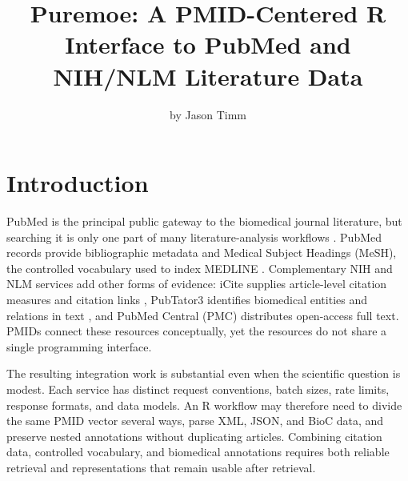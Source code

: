 \title{Puremoe: A PMID-Centered R Interface to PubMed and NIH/NLM Literature Data}


\author{by Jason Timm}

\maketitle


\section{Introduction}\label{introduction}

PubMed is the principal public gateway to the biomedical journal literature,
but searching it is only one part of many literature-analysis workflows
\citep{lu2011pubmed}. PubMed records provide bibliographic metadata and Medical
Subject Headings (MeSH), the controlled vocabulary used to index MEDLINE
\citep{lipscomb2000mesh}. Complementary NIH and NLM services add other forms of
evidence: iCite supplies article-level citation measures and citation links
\citep{hutchins2016rcr}, PubTator3 identifies biomedical entities and relations in
text \citep{wei2024pubtator}, and PubMed Central (PMC) distributes open-access full
text. PMIDs connect these resources conceptually, yet the resources do not
share a single programming interface.

The resulting integration work is substantial even when the scientific
question is modest. Each service has distinct request conventions, batch sizes,
rate limits, response formats, and data models. An R workflow may therefore need
to divide the same PMID vector several ways, parse XML, JSON, and BioC data, and
preserve nested annotations without duplicating articles. Combining citation
data, controlled vocabulary, and biomedical annotations requires both reliable
retrieval and representations that remain usable after retrieval.

